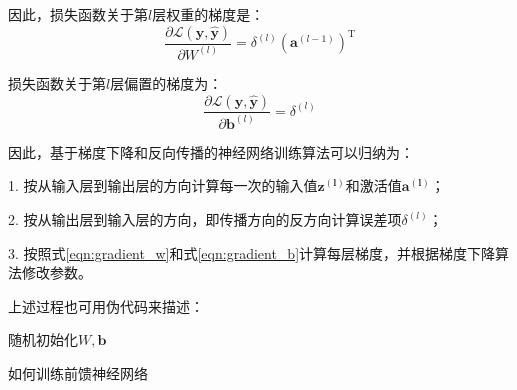 因此，损失函数关于第$l$层权重的梯度是：
\begin{equation}
\label{eqn:gradient_w} 
\frac{\partial \mathcal{L}(\mathbf{y}, \hat{\mathbf{y}})}{\partial W^{(l)}}=\delta^{(l)}\left(\mathbf{a}^{(l-1)}\right)^{\mathrm{T}}
\end{equation}

损失函数关于第$l$层偏置的梯度为：
\begin{equation} 
\label{eqn:gradient_b}
\frac{\partial \mathcal{L}(\mathbf{y}, \hat{\mathbf{y}})}{\partial \mathbf{b}^{(l)}}=\delta^{(l)}
\end{equation}

因此，基于梯度下降和反向传播的神经网络训练算法可以归纳为：

1. 按从输入层到输出层的方向计算每一次的输入值$\mathbf{z^{(l)}}$和激活值$\mathbf{a^{(l)}}$； 

2. 按从输出层到输入层的方向，即传播方向的反方向计算误差项$\delta^{(l)}$； 

3. 按照式\ref{eqn:gradient_w}和式\ref{eqn:gradient_b}计算每层梯度，并根据梯度下降算法修改参数。

上述过程也可用伪代码来描述：
\begin{algorithm}[H]
	随机初始化$W, \mathbf{b}$
	\caption{如何训练前馈神经网络}
   \end{algorithm}

